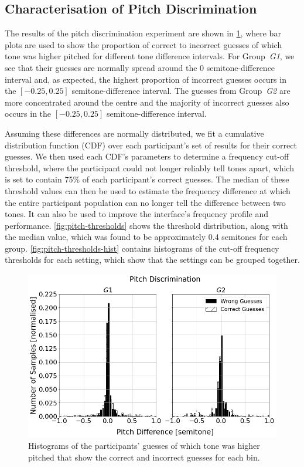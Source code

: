 \documentclass[acmsmall]{acmart}
\begin{document}
\subsection{Characterisation of Pitch Discrimination}

The results of the pitch discrimination experiment are shown in \cref{fig:pitch-discrimination}, where bar plots are used to show the proportion of correct to incorrect guesses of which tone was higher pitched for different tone difference intervals. 
For Group~\textit{G1}, we see that their guesses are normally spread around the 0 semitone-difference interval and, as expected, the highest proportion of incorrect guesses occurs in the $[-0.25, 0.25]$ semitone-difference interval. 
The guesses from Group~\textit{G2} are more concentrated around the centre and the majority of incorrect guesses also occurs in the $[-0.25, 0.25]$ semitone-difference interval.

Assuming these differences are normally distributed, we fit a cumulative distribution function (CDF) over each participant's set of results for their correct guesses.
We then used each CDF's parameters to determine a frequency cut-off threshold, where the participant could not longer reliably tell tones apart, which is set to contain 75\% of each participant's correct guesses.
The median of these threshold values can then be used to estimate the frequency difference at which the entire participant population can no longer tell the difference between two tones. 
It can also be used to improve the interface's frequency profile and performance. 
\cref{fig:pitch-thresholds} shows the threshold distribution, along with the median value, which was found to be approximately 0.4 semitones for each group. 
\cref{fig:pitch-thresholds-hist} contains histograms of the cut-off frequency thresholds for each setting, which show that the settings can be grouped together.

\begin{figure}
  \centering
  \includegraphics[width=0.8\columnwidth]{figures/pitch_discrimination.png}
  \caption{Histograms of the participants' guesses of which tone was higher pitched that show the correct and incorrect guesses for each bin. }\label{fig:pitch-discrimination}
\end{figure}
\end{document}
